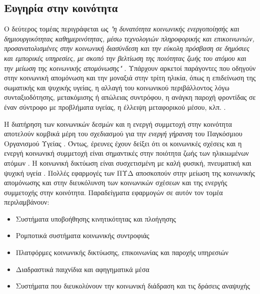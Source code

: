 \subsection{Ευγηρία στην κοινότητα}

Ο δεύτερος τομέας περιγράφεται ως \textit{"η δυνατότητα κοινωνικής ενεργοποίησής και δημιουργικότητας καθημερινότητας, μέσω τεχνολογιών πληροφορικής και επικοινωνιών, προσανατολισμένες στην κοινωνική διασύνδεση και την εύκολη πρόσβαση σε δημόσιες και εμπορικές υπηρεσίες, με σκοπό την βελτίωση της ποιότητας ζωής του ατόμου και την μείωση της κοινωνικής απομόνωσης"} \cite{broek}.
Υπάρχουν αρκετοί παράγοντες που οδηγούν στην κοινωνική απομόνωση και την μοναξιά στην τρίτη ηλικία, όπως η επιδείνωση της σωματικής και ψυχικής υγείας, η αλλαγή του κοινωνικού περιβάλλοντος λόγω συνταξιοδότησης, μετακόμισης ή απώλειας συντρόφου, η ανάγκη παροχή φροντίδας σε έναν σύντροφο με προβλήματα υγείας, η έλλειψη μεταφορικού μέσου, κλπ. \cite{Wherton2009}.
\par
Η διατήρηση των κοινωνικών δεσμών και η ενεργή συμμετοχή στην κοινότητα αποτελούν κομβικά μέρη του σχεδιασμού για την \textit{ενεργή γήρανση} του Παγκόσμιου Οργανισμού Υγείας \cite{WHO2015}.
Όντως, έρευνες έχουν δείξει ότι οι κοινωνικές σχέσεις και η ενεργή κοινωνική συμμετοχή είναι σημαντικές στην ποιότητα ζωής των ηλικιωμένων ατόμων \cite{Bowling2003}\cite{GABRIEL2004}.
Η κοινωνική δικτύωση είναι συσχετισμένη με καλή φυσική, πνευματική και ψυχική υγεία \cite{Luanaigh2008}\cite{Shankar2011}\cite{Thurston2009}.
Πολλές εφαρμογές των ΠΥΔ αποσκοπούν στην μείωση της κοινωνικής απομόνωσης και στην διευκόλυνση των κοινωνικών σχέσεων και της ενεργής συμμετοχής στην κοινότητα.
Παραδείγματα εφαρμογών σε αυτόν τον τομέα περιλαμβάνουν:
\begin{itemize}
    \item Συστήματα υποβοήθησης κινητικότητας και πλοήγησης
    \item Ρομποτικά συστήματα κοινωνικής συντροφιάς
    \item Πλατφόρμες κοινωνικής δικτύωσης, επικοινωνίας και παροχής υπηρεσιών
    \item Διαδραστικά παιχνίδια και αφηγηματικά μέσα
    \item Συστήματα που διευκολύνουν την κοινωνική διάδραση και τις δράσεις αναψυχής
\end{itemize}{}

